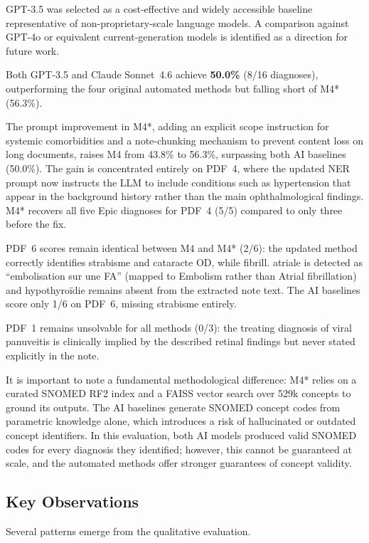 GPT-3.5 was selected as a cost-effective and widely accessible baseline representative of non-proprietary-scale language models. A comparison against GPT-4o or equivalent current-generation models is identified as a direction for future work.

Both GPT-3.5 and Claude Sonnet~4.6 achieve \textbf{50.0\%} (8/16 diagnoses), outperforming the four original automated methods but falling short of M4* (56.3\%).

The prompt improvement in M4*, adding an explicit scope instruction for systemic comorbidities and a note-chunking mechanism to prevent content loss on long documents, raises M4 from 43.8\% to 56.3\%, surpassing both AI baselines (50.0\%). The gain is concentrated entirely on PDF~4, where the updated NER prompt now instructs the LLM to include conditions such as hypertension that appear in the background history rather than the main ophthalmological findings. M4* recovers all five Epic diagnoses for PDF~4 (5/5) compared to only three before the fix.

PDF~6 scores remain identical between M4 and M4* (2/6): the updated method correctly identifies strabisme and cataracte OD, while fibrill. atriale is detected as ``embolisation sur une FA'' (mapped to Embolism rather than Atrial fibrillation) and hypothyroïdie remains absent from the extracted note text. The AI baselines score only 1/6 on PDF~6, missing strabisme entirely.

PDF~1 remains unsolvable for all methods (0/3): the treating diagnosis of viral panuveitis is clinically implied by the described retinal findings but never stated explicitly in the note.

It is important to note a fundamental methodological difference: M4* relies on a curated SNOMED RF2 index and a FAISS vector search over 529k concepts to ground its outputs. The AI baselines generate SNOMED concept codes from parametric knowledge alone, which introduces a risk of hallucinated or outdated concept identifiers. In this evaluation, both AI models produced valid SNOMED codes for every diagnosis they identified; however, this cannot be guaranteed at scale, and the automated methods offer stronger guarantees of concept validity.

\subsection{Key Observations}

Several patterns emerge from the qualitative evaluation.

